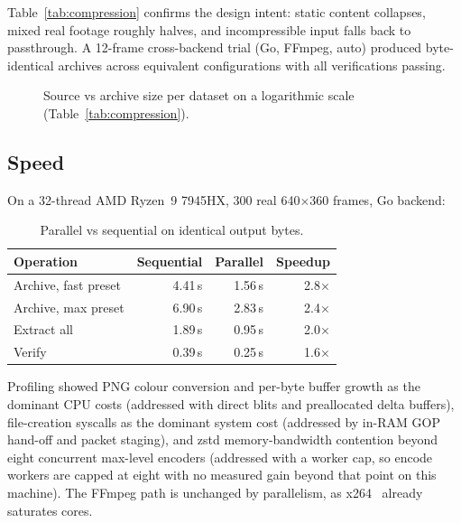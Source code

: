 \documentclass[11pt,a4paper]{article}
\begin{document}
Table~\ref{tab:compression} confirms the design intent: static content
collapses, mixed real footage roughly halves, and incompressible input falls
back to passthrough. A 12-frame cross-backend trial (Go, FFmpeg, auto) produced
byte-identical archives across equivalent configurations with all verifications
passing.

\begin{figure}[h]
\centering
{}
\caption{Source vs archive size per dataset on a logarithmic scale
(Table~\ref{tab:compression}).}
\label{fig:compression}
\end{figure}

\subsection{Speed}

On a 32-thread AMD Ryzen~9 7945HX, 300 real 640$\times$360 frames, Go backend:

\begin{table}[h]
\centering
\begin{tabular}{@{}lrrr@{}}
\toprule
Operation & Sequential & Parallel & Speedup \\
\midrule
Archive, fast preset & 4.41\,s & 1.56\,s & 2.8$\times$ \\
Archive, max preset & 6.90\,s & 2.83\,s & 2.4$\times$ \\
Extract all & 1.89\,s & 0.95\,s & 2.0$\times$ \\
Verify & 0.39\,s & 0.25\,s & 1.6$\times$ \\
\bottomrule
\end{tabular}
\caption{Parallel vs sequential on identical output bytes.}
\label{tab:speed}
\end{table}

Profiling showed PNG colour conversion and per-byte buffer growth as the
dominant CPU costs (addressed with direct blits and preallocated delta
buffers), file-creation syscalls as the dominant system cost (addressed by
in-RAM GOP hand-off and packet staging), and zstd memory-bandwidth contention
beyond eight concurrent max-level encoders (addressed with a worker cap, so
encode workers are capped at eight with no measured gain beyond that point on
this machine).
The FFmpeg path is unchanged by parallelism, as x264~\cite{x264} already saturates cores.
\end{document}
